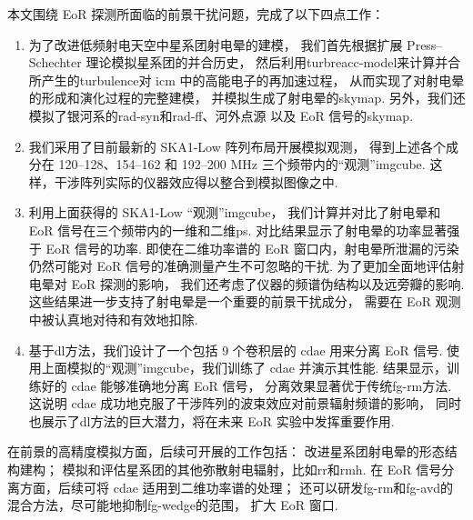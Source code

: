 
\begin{summary}

本文围绕 EoR 探测所面临的前景干扰问题，完成了以下四点工作：
\begin{enumerate}
\item
为了改进低频射电天空中星系团射电晕的建模，
我们首先根据扩展 Press--Schechter 理论模拟星系团的并合历史，
然后利用\ac{turbreacc-model}来计算并合所产生的\ac{turbulence}对 \ac{icm}
中的高能电子的再加速过程，
从而实现了对射电晕的形成和演化过程的完整建模，
并模拟生成了射电晕的\ac{skymap}.
另外，我们还模拟了银河系的\ac{rad-syn}和\ac{rad-ff}、河外点源
以及 EoR 信号的\ac{skymap}.

\item
我们采用了目前最新的 SKA1-Low 阵列布局开展模拟观测，
得到上述各个成分在 \numrange{120}{128}、\numrange{154}{162}
和 \numrange{192}{200} \si{\MHz} 三个频带内的\enquote{观测}\ac{imgcube}.
这样，干涉阵列实际的仪器效应得以整合到模拟图像之中.

\item
利用上面获得的 SKA1-Low \enquote{观测}\ac{imgcube}，
我们计算并对比了射电晕和 EoR 信号在三个频带内的一维和二维\ac{ps}.
对比结果显示了射电晕的功率显著强于 EoR 信号的功率.
即使在二维功率谱的 EoR 窗口内，射电晕所泄漏的污染仍然可能对
EoR 信号的准确测量产生不可忽略的干扰.
为了更加全面地评估射电晕对 EoR 探测的影响，
我们还考虑了仪器的频谱伪结构以及远旁瓣的影响.
这些结果进一步支持了射电晕是一个重要的前景干扰成分，
需要在 EoR 观测中被认真地对待和有效地扣除.

\item
基于\ac{dl}方法，我们设计了一个包括 9 个卷积层的 \ac{cdae} 用来分离 EoR 信号.
使用上面模拟的\enquote{观测}\ac{imgcube}，我们训练了 \ac{cdae} 并演示其性能.
结果显示，训练好的 \ac{cdae} 能够准确地分离 EoR 信号，
分离效果显著优于传统\ac{fg-rm}方法.
这说明 \ac{cdae} 成功地克服了干涉阵列的波束效应对前景辐射频谱的影响，
同时也展示了\ac{dl}方法的巨大潜力，将在未来 EoR 实验中发挥重要作用.
\end{enumerate}

在前景的高精度模拟方面，后续可开展的工作包括：
改进星系团射电晕的形态结构建构；
模拟和评估星系团的其他弥散射电辐射，比如\ac{rr}和\ac{rmh}.
在 EoR 信号分离方面，后续可将 \ac{cdae} 适用到二维功率谱的处理；
还可以研发\ac{fg-rm}和\ac{fg-avd}的混合方法，尽可能地抑制\ac{fg-wedge}的范围，
扩大 EoR 窗口.

\end{summary}
